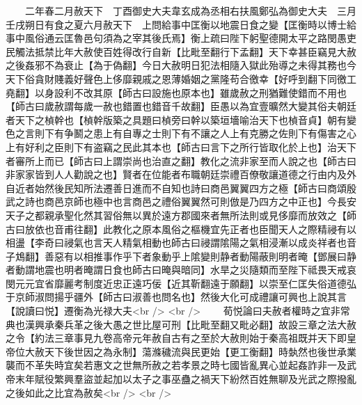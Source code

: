 　　二年春二月赦天下　丁酉御史大夫韋玄成為丞相右扶風鄭弘為御史大夫　三月壬戌朔日有食之夏六月赦天下　上問給事中匡衡以地震日食之變【匡衡時以博士給事中風俗通云匡魯邑句須為之宰其後氏焉】衡上疏曰陛下躬聖德開太平之路閔愚吏民觸法抵禁比年大赦使百姓得改行自新【比毗至翻行下孟翻】天下幸甚臣竊見大赦之後姦邪不為衰止【為于偽翻】今日大赦明日犯法相隨入獄此殆導之未得其務也今天下俗貪財賤義好聲色上侈靡親戚之恩薄婚姻之黨隆苟合徼幸【好呼到翻下同徼工堯翻】以身設利不改其原【師古曰設施也原本也】雖歲赦之刑猶難使錯而不用也【師古曰歲赦謂每歲一赦也錯置也錯音千故翻】臣愚以為宜壹曠然大變其俗夫朝廷者天下之楨幹也【楨幹版築之具題曰楨旁曰幹以築垣墻喻治天下也楨音貞】朝有變色之言則下有争鬭之患上有自專之士則下有不讓之人上有克勝之佐則下有傷害之心上有好利之臣則下有盗竊之民此其本也【師古曰言下之所行皆取化於上也】治天下者審所上而已【師古曰上謂崇尚也治直之翻】教化之流非家至而人說之也【師古曰非家家皆到人人勸說之也】賢者在位能者布職朝廷崇禮百僚敬讓道德之行由内及外自近者始然後民知所法遷善日進而不自知也詩曰商邑翼翼四方之極【師古曰商頌殷武之詩也商邑京師也極中也言商邑之禮俗翼翼然可則倣是乃四方之中正也】今長安天子之都親承聖化然其習俗無以異於遠方郡國來者無所法則或見侈靡而放效之【師古曰放依也音甫往翻】此教化之原本風俗之樞機宜先正者也臣聞天人之際精祲有以相盪【李奇曰祲氣也言天人精氣相動也師古曰祲謂隂陽之氣相浸漸以成炎祥者也音子鴆翻】善惡有以相推事作乎下者象動乎上隂變則静者動陽蔽則明者晻【鄧展曰静者動謂地震也明者晻謂日食也師古曰晻與暗同】水旱之災隨類而至陛下祗畏天戒哀閔元元宜省靡麗考制度近忠正遠巧佞【近其靳翻遠于願翻】以崇至仁匡失俗道德弘于京師淑問揚乎疆外【師古曰淑善也問名也】然後大化可成禮讓可興也上說其言【說讀曰悦】遷衡為光禄大夫<br />
<br />
　　荀悦論曰夫赦者權時之宜非常典也漢興承秦兵革之後大愚之世比屋可刑【比毗至翻又毗必翻】故設三章之法大赦之令【約法三章事見九卷高帝元年赦自古有之至於大赦則始于秦高祖既并天下即皇帝位大赦天下後世因之為永制】蕩滌穢流與民更始【更工衡翻】時埶然也後世承業襲而不革失時宜矣若惠文之世無所赦之若孝景之時七國皆亂異心並起姦詐非一及武帝末年賦役繁興羣盜並起加以太子之事巫蠱之禍天下紛然百姓無聊及光武之際撥亂之後如此之比宜為赦矣<br />
<br />
